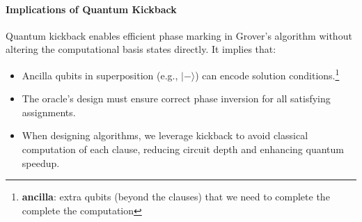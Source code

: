 
\paragraph{Implications of Quantum Kickback}\label{par:Implications of
Quantum Kickback}

Quantum kickback enables efficient phase marking in Grover’s algorithm
without altering the computational basis states directly. It implies that:

\begin{itemize}
  \item Ancilla qubits in superposition (e.g., $|-\rangle$) can encode
    solution conditions.\footnote{\textbf{ancilla}: extra qubits (beyond the
    clauses) that we need to complete the complete the computation}

  \item The oracle’s design must ensure correct phase inversion for all
    satisfying assignments.

  \item When designing algorithms, we leverage kickback to avoid classical
    computation of each clause, reducing circuit depth and enhancing quantum
    speedup.
\end{itemize}

